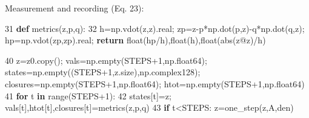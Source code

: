 \documentclass[
  a4paper,
]{ltjsarticle}
\newenvironment{Shaded}{}{}
\newcommand{\BuiltInTok}[1]{\textcolor[rgb]{0.00,0.50,0.00}{#1}}
\newcommand{\ControlFlowTok}[1]{\textcolor[rgb]{0.00,0.44,0.13}{\textbf{#1}}}
\newcommand{\DecValTok}[1]{\textcolor[rgb]{0.25,0.63,0.44}{#1}}
\newcommand{\KeywordTok}[1]{\textcolor[rgb]{0.00,0.44,0.13}{\textbf{#1}}}
\newcommand{\NormalTok}[1]{#1}
\newcommand{\OperatorTok}[1]{\textcolor[rgb]{0.40,0.40,0.40}{#1}}
\begin{document}
Measurement and recording (Eq. 23):

\begin{Shaded}
\begin{Highlighting}[]
    \DecValTok{31}  \KeywordTok{def}\NormalTok{ metrics(z,p,q):}
    \DecValTok{32}\NormalTok{      h}\OperatorTok{=}\NormalTok{np.vdot(z,z).real}\OperatorTok{;}\NormalTok{ zp}\OperatorTok{=}\NormalTok{z}\OperatorTok{{-}}\NormalTok{p}\OperatorTok{*}\NormalTok{np.dot(p,z)}\OperatorTok{{-}}\NormalTok{q}\OperatorTok{*}\NormalTok{np.dot(q,z)}\OperatorTok{;}\NormalTok{ hp}\OperatorTok{=}\NormalTok{np.vdot(zp,zp).real}\OperatorTok{;} \ControlFlowTok{return} \BuiltInTok{float}\NormalTok{(hp}\OperatorTok{/}\NormalTok{h),}\BuiltInTok{float}\NormalTok{(h),}\BuiltInTok{float}\NormalTok{(}\BuiltInTok{abs}\NormalTok{(z}\OperatorTok{@}\NormalTok{z)}\OperatorTok{/}\NormalTok{h)}
\end{Highlighting}
\end{Shaded}

\begin{Shaded}
\begin{Highlighting}[]
    \DecValTok{40}\NormalTok{          z}\OperatorTok{=}\NormalTok{z0.copy()}\OperatorTok{;}\NormalTok{ vals}\OperatorTok{=}\NormalTok{np.empty(STEPS}\OperatorTok{+}\DecValTok{1}\NormalTok{,np.float64)}\OperatorTok{;}\NormalTok{ states}\OperatorTok{=}\NormalTok{np.empty((STEPS}\OperatorTok{+}\DecValTok{1}\NormalTok{,z.size),np.complex128)}\OperatorTok{;}\NormalTok{ closures}\OperatorTok{=}\NormalTok{np.empty(STEPS}\OperatorTok{+}\DecValTok{1}\NormalTok{,np.float64)}\OperatorTok{;}\NormalTok{ htot}\OperatorTok{=}\NormalTok{np.empty(STEPS}\OperatorTok{+}\DecValTok{1}\NormalTok{,np.float64)}
    \DecValTok{41}          \ControlFlowTok{for}\NormalTok{ t }\KeywordTok{in} \BuiltInTok{range}\NormalTok{(STEPS}\OperatorTok{+}\DecValTok{1}\NormalTok{):}
    \DecValTok{42}\NormalTok{              states[t]}\OperatorTok{=}\NormalTok{z}\OperatorTok{;}\NormalTok{ vals[t],htot[t],closures[t]}\OperatorTok{=}\NormalTok{metrics(z,p,q)}
    \DecValTok{43}              \ControlFlowTok{if}\NormalTok{ t}\OperatorTok{\textless{}}\NormalTok{STEPS: z}\OperatorTok{=}\NormalTok{one\_step(z,A,den)}
\end{Highlighting}
\end{Shaded}
\end{document}
